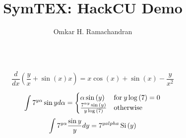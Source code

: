 \documentclass[english]{article}
\begin{document}
\title{SymTEX: HackCU Demo}

\author{Omkar H. Ramachandran}
\maketitle

$$$$

$$
\frac{d}{dx}{(\frac{y}{x}+\sin(x)x)}=x \cos{\left (x \right )} + \sin{\left (x \right )} - \frac{y}{x^{2}}
$$

$$
\intop{7^{y\alpha} \sin{y} d\alpha}=\begin{cases} \alpha \sin{\left (y \right )} & \text{for}\: y \log{\left (7 \right )} = 0 \\\frac{7^{\alpha y} \sin{\left (y \right )}}{y \log{\left (7 \right )}} & \text{otherwise} \end{cases}
$$
$$
\intop{7^{y\alpha} \frac{\sin{y}}{y} dy}=7^{yalpha} \operatorname{Si}{\left (y \right )}
$$
\end{document}
